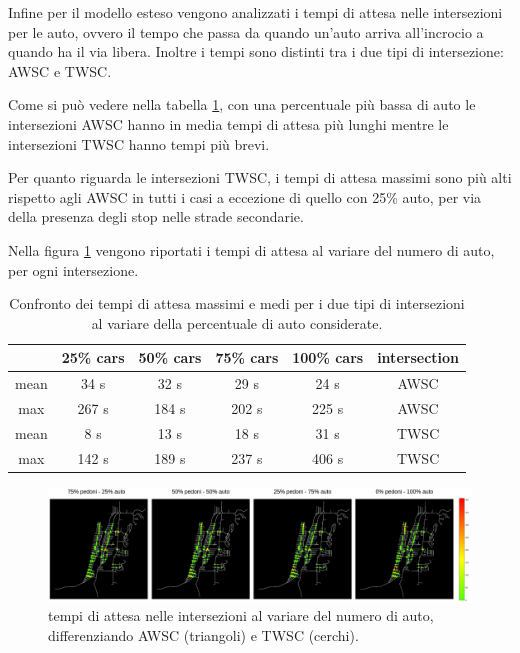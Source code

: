 \newpage


\pagebreak

Infine per il modello esteso vengono analizzati i tempi di attesa nelle intersezioni per le auto,
ovvero il tempo che passa da quando un'auto arriva all'incrocio a quando ha il via libera. 
Inoltre i tempi sono distinti tra i due tipi di intersezione: AWSC e TWSC.

Come si può vedere nella tabella \ref{tab:analisi-car-delay}, con una percentuale più bassa di auto le intersezioni AWSC 
hanno in media tempi di attesa più lunghi mentre le intersezioni TWSC hanno tempi più brevi.

Per quanto riguarda le intersezioni TWSC, i tempi di attesa massimi sono più alti rispetto agli AWSC in tutti i casi a eccezione di quello con 25\% auto, 
per via della presenza degli stop nelle strade secondarie.

Nella figura \ref{fig:analisi-comparison-car-delay} vengono riportati i tempi di attesa al variare del numero di auto,
per ogni intersezione.



\begin{table}[ht]
    \centering
    \begin{tabular}{|c|c|c|c|c|c|}
    \hline
         & 25\% cars & 50\% cars & 75\% cars & 100\% cars & intersection \\ \hline
    mean & 34 s  & 32 s  & 29 s  & 24 s  & AWSC         \\ \hline
    max  & 267 s & 184 s & 202 s & 225 s & AWSC         \\ \hline
    mean & 8 s   & 13 s  & 18 s  & 31 s  & TWSC         \\ \hline
    max  & 142 s & 189 s & 237 s & 406 s & TWSC         \\ \hline
    \end{tabular}
    \caption{Confronto dei tempi di attesa massimi e medi per i due tipi di intersezioni al variare della percentuale di auto considerate.}
    \label{tab:analisi-car-delay}
\end{table}


\newpage


\begin{figure}[ht]
    \includegraphics[width=1\textwidth]{images/analisi/comparison-car-delay.png}   
    \caption{tempi di attesa nelle intersezioni al variare del numero di auto, differenziando AWSC (triangoli) e TWSC (cerchi).}
    \label{fig:analisi-comparison-car-delay}
\end{figure}

